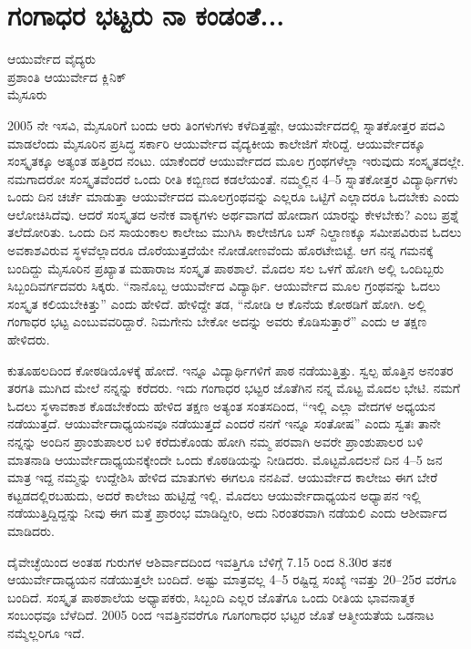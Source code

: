 {\fontsize{14}{16}\selectfont
\chapter{ಗಂಗಾಧರ ಭಟ್ಟರು ನಾ ಕಂಡಂತೆ...}

\begin{center}
\smallskip
ಆಯುರ್ವೇದ ವೈದ್ಯರು\\
ಪ್ರಶಾಂತಿ ಆಯುರ್ವೇದ ಕ್ಲಿನಿಕ್\\
ಮೈಸೂರು
\addrule
\end{center}
2005 ನೇ ಇಸವಿ, ಮೈಸೂರಿಗೆ ಬಂದು ಆರು ತಿಂಗಳುಗಳು ಕಳೆದಿತ್ತಷ್ಟೇ, ಆಯುರ್ವೇದದಲ್ಲಿ ಸ್ನಾತಕೋತ್ತರ ಪದವಿ ಮಾಡಲೆಂದು ಮೈಸೂರಿನ ಪ್ರಸಿದ್ಧ ಸರ್ಕಾರಿ ಆಯುರ್ವೇದ ವೈದ್ಯಕೀಯ ಕಾಲೇಜಿಗೆ ಸೇರಿದ್ದೆ. ಆಯುರ್ವೇದಕ್ಕೂ ಸಂಸ್ಕೃತಕ್ಕೂ ಅತ್ಯಂತ ಹತ್ತಿರದ ನಂಟು. ಯಾಕೆಂದರೆ ಆಯುರ್ವೇದದ ಮೂಲ ಗ್ರಂಥಗಳೆಲ್ಲಾ ಇರುವುದು ಸಂಸ್ಕೃತದಲ್ಲೇ. ನಮಗಾದರೋ ಸಂಸ್ಕೃತವೆಂದರೆ ಒಂದು ರೀತಿ ಕಬ್ಬಿಣದ ಕಡಲೆಯಂತೆ. ನಮ್ಮಲ್ಲಿನ 4–5 ಸ್ನಾತಕೋತ್ತರ ವಿದ್ಯಾರ್ಥಿಗಳು ಒಂದು ದಿನ ಚರ್ಚೆ ಮಾಡುತ್ತಾ ಆಯುರ್ವೇದದ ಮೂಲಗ್ರಂಥವನ್ನು ಎಲ್ಲರೂ ಒಟ್ಟಿಗೆ ಎಲ್ಲಾದರೂ ಓದಬೇಕು ಎಂದು ಆಲೋಚಿಸಿದೆವು. ಆದರೆ ಸಂಸ್ಕೃತದ ಅನೇಕ ವಾಕ್ಯಗಳು ಅರ್ಥವಾಗದೆ ಹೋದಾಗ ಯಾರನ್ನು ಕೇಳಬೇಕು? ಎಂಬ ಪ್ರಶ್ನೆ ತಲೆದೋರಿತು. ಒಂದು ದಿನ ಸಾಯಂಕಾಲ ಕಾಲೇಜು ಮುಗಿಸಿ ಕಾಲೇಜಿಗೂ ಬಸ್ ನಿಲ್ದಾಣಕ್ಕೂ ಸಮೀಪವಿರುವ ಓದಲು ಅವಕಾಶವಿರುವ ಸ್ಥಳವೆಲ್ಲಾದರೂ ದೊರೆಯುತ್ತದೆಯೇ ನೋಡೋಣವೆಂದು ಹೊರಟೇಬಿಟ್ಟೆ. ಆಗ ನನ್ನ ಗಮನಕ್ಕೆ ಬಂದಿದ್ದು ಮೈಸೂರಿನ ಪ್ರಖ್ಯಾತ ಮಹಾರಾಜ ಸಂಸ್ಕೃತ ಪಾಠಶಾಲೆ. ಮೊದಲ ಸಲ ಒಳಗೆ ಹೋಗಿ ಅಲ್ಲಿ ಒಂದಿಬ್ಬರು ಸಿಬ್ಬಂದಿವರ್ಗದವರು ಸಿಕ್ಕರು. “ನಾನೊಬ್ಬ ಆಯುರ್ವೇದ ವಿದ್ಯಾರ್ಥಿ. ಆಯುರ್ವೇದ ಮೂಲ ಗ್ರಂಥವನ್ನು ಓದಲು ಸಂಸ್ಕೃತ ಕಲಿಯಬೇಕಿತ್ತು” ಎಂದು ಹೇಳಿದೆ. ಹೇಳಿದ್ದೇ ತಡ,  “ನೋಡಿ ಆ ಕೊನೆಯ ಕೋಠಡಿಗೆ ಹೋಗಿ. ಅಲ್ಲಿ ಗಂಗಾಧರ ಭಟ್ಟ ಎಂಬುವವರಿದ್ದಾರೆ. ನಿಮಗೇನು ಬೇಕೋ ಅದನ್ನು ಅವರು ಕೊಡಿಸುತ್ತಾರೆ” ಎಂದು ಆ ತಕ್ಷಣ ಹೇಳಿದರು.

ಕುತೂಹಲದಿಂದ ಕೋಠಡಿಯೊಳಕ್ಕೆ ಹೋದೆ. ಇನ್ನೂ ವಿದ್ಯಾರ್ಥಿಗಳಿಗೆ ಪಾಠ ನಡೆಯುತ್ತಿತ್ತು. ಸ್ವಲ್ಪ ಹೊತ್ತಿನ  ಅನಂತರ ತರಗತಿ ಮುಗಿದ ಮೇಲೆ ನನ್ನನ್ನು ಕರೆದರು. ಇದು ಗಂಗಾಧರ ಭಟ್ಟರ ಜೊತೆಗಿನ ನನ್ನ ಮೊಟ್ಟ ಮೊದಲ ಭೇಟಿ. ನಮಗೆ ಓದಲು  ಸ್ಥಳಾವಕಾಶ ಕೊಡಬೇಕೆಂದು ಹೇಳಿದ ತಕ್ಷಣ ಅತ್ಯಂತ ಸಂತಸದಿಂದ, “ಇಲ್ಲಿ ಎಲ್ಲಾ ವೇದಗಳ ಅಧ್ಯಯನ ನಡೆಯುತ್ತದೆ. ಆಯುರ್ವೇದಾಧ್ಯಯನವೂ ನಡೆಯುತ್ತದೆ ಎಂದರೆ ನನಗೆ ಇನ್ನೂ ಸಂತೋಷ” ಎಂದು ಸ್ವತಃ ತಾನೇ ನನ್ನನ್ನು ಅಂದಿನ ಪ್ರಾಂಶುಪಾಲರ ಬಳಿ ಕರೆದುಕೊಂಡು ಹೋಗಿ ನಮ್ಮ ಪರವಾಗಿ ಅವರೇ ಪ್ರಾಂಶುಪಾಲರ ಬಳಿ ಮಾತನಾಡಿ ಆಯುರ್ವೇದಾಧ್ಯಯನಕ್ಕೇಂದೇ ಒಂದು ಕೊಠಡಿಯನ್ನು ನೀಡಿದರು. 
ಮೊಟ್ಟಮೊದಲನೆ ದಿನ 4–5 ಜನ ಮಾತ್ರ ಇದ್ದ ನಮ್ಮನ್ನು ಉದ್ದೇಶಿಸಿ ಹೇಳಿದ ಮಾತುಗಳು ಈಗಲೂ ನನಪಿವೆ. ಆಯುರ್ವೇದ ಕಾಲೇಜು ಈಗ ಬೇರೆ ಕಟ್ಟಡದಲ್ಲಿರಬಹುದು, ಅದರೆ ಕಾಲೇಜು ಹುಟ್ಟಿದ್ದೆ ಇಲ್ಲಿ. ಮೊದಲು ಆಯುರ್ವೇದಾಧ್ಯಯನ ಅಧ್ಯಾಪನ ಇಲ್ಲಿ ನಡೆಯುತ್ತಿದ್ದಿದ್ದನ್ನು ನೀವು ಈಗ ಮತ್ತೆ ಪ್ರಾರಂಭ ಮಾಡಿದ್ದೀರಿ, ಅದು ನಿರಂತರವಾಗಿ ನಡೆಯಲಿ ಎಂದು ಆಶೀರ್ವಾದ ಮಾಡಿದರು. 


ದೈವೇಚ್ಛೆಯಿಂದ ಅಂತಹ ಗುರುಗಳ ಆಶಿರ್ವಾದದಿಂದ ಇವತ್ತಿಗೂ ಬೆಳಿಗ್ಗೆ 7.15 ರಿಂದ 8.30ರ ತನಕ ಆಯುರ್ವೇದಾಧ್ಯಯನ ನಡೆಯುತ್ತಲೇ ಬಂದಿದೆ. ಅಷ್ಟು ಮಾತ್ರವಲ್ಲ 4–5 ರಷ್ಟಿದ್ದ ಸಂಖ್ಯೆ ಇವತ್ತು 20–25ರ ವರೆಗೂ ಬಂದಿದೆ. ಸಂಸ್ಕೃತ ಪಾಠಶಾಲೆಯ ಅಧ್ಯಾಪಕರು, ಸಿಬ್ಬಂದಿ ಎಲ್ಲರ ಜೊತೆಗೂ ಒಂದು ರೀತಿಯ ಭಾವನಾತ್ಮಕ ಸಂಬಂಧವೂ ಬೆಳೆದಿದೆ. 2005 ರಿಂದ ಇವತ್ತಿನವರೆಗೂ ಗೂಗಂಗಾಧರ ಭಟ್ಟರ ಜೊತೆ ಆತ್ಮೀಯತೆಯ ಒಡನಾಟ ನಮ್ಮೆಲ್ಲರಿಗೂ ಇದೆ.

}
